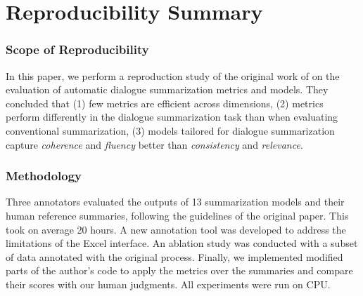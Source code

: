 

\section*{\centering Reproducibility Summary}


\subsubsection*{Scope of Reproducibility}

In this paper, we perform a reproduction study of the original work of \citet{gao2022dialsummeval} on the evaluation of automatic dialogue summarization metrics and models. They concluded that (1) few metrics are efficient across dimensions, (2) metrics perform differently in the dialogue summarization task than when evaluating conventional summarization, (3) models tailored for dialogue summarization capture
\textit{coherence} and \textit{fluency} better than \textit{consistency} and \textit{relevance}.

\subsubsection*{Methodology}
Three annotators evaluated the outputs of 13 summarization models and their human reference summaries, following the guidelines of the original paper. This took on average 20 hours. A new annotation tool was developed to address the limitations of the Excel interface. An ablation study was conducted with a subset of data annotated with the original process. Finally, we implemented modified parts of the author's code to apply the metrics over the summaries and compare their scores with our human judgments. All experiments were run on CPU.

